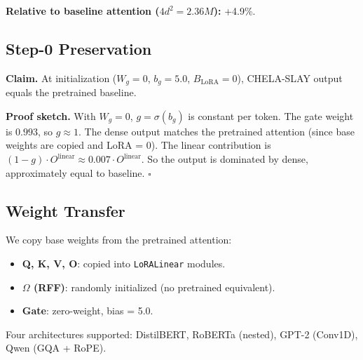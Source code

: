 \textbf{Relative to baseline attention ($4 d^2 = 2.36M$):} +4.9\%.

\subsection{Step-0 Preservation}

\textbf{Claim.} At initialization ($W_g = 0$, $b_g = 5.0$, 
$B_\text{LoRA} = 0$), CHELA-SLAY output equals the pretrained baseline.

\textbf{Proof sketch.} With $W_g = 0$, $g = \sigma(b_g)$ is constant per token. 
The gate weight is $0.993$, so $g \approx 1$. The dense output 
matches the pretrained attention (since base weights are copied and 
LoRA = 0). The linear contribution is $(1 - g) \cdot O^\text{linear} 
\approx 0.007 \cdot O^\text{linear}$. So the output is dominated by dense, 
approximately equal to baseline. $\square$

\subsection{Weight Transfer}

We copy base weights from the pretrained attention:

\begin{itemize}
\item \textbf{Q, K, V, O}: copied into \texttt{LoRALinear} modules.
\item \textbf{$\Omega$ (RFF)}: randomly initialized (no pretrained equivalent).
\item \textbf{Gate}: zero-weight, bias = 5.0.

\end{itemize}
Four architectures supported: DistilBERT, RoBERTa (nested), GPT-2 (Conv1D), 
Qwen (GQA + RoPE).

